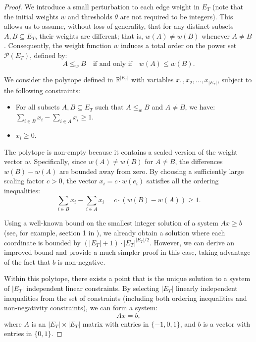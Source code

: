 \documentclass[11pt, letter]{article}
\theoremstyle{remark}
\begin{document}
\begin{proof}
We introduce a small perturbation to each edge weight in $ E_T $ (note that the initial weights $w$ and thresholds $\theta$ are not required to be integers). This allows us to assume, without loss of generality, that for any distinct subsets $ A, B \subseteq E_T $, their weights are different; that is, $ w(A) \neq w(B) $ whenever $ A \neq B $. Consequently, the weight function $ w $ induces a total order on the power set $ \mathcal{P}(E_T) $, defined by:
$$
A \leq_w B \quad \text{if and only if} \quad w(A) \leq w(B).
$$

We consider the polytope defined in $ \mathbb{R}^{|E_T|} $ with variables $ x_1, x_2, \dots, x_{|E_T|} $, subject to the following constraints:

\begin{itemize}
    \item For all subsets $ A, B \subseteq E_T $ such that $ A \leq_w B $ and $A \neq B$, we have:
   $
   \sum_{i \in B} x_i - \sum_{i \in A} x_i \geq 1.
   $
    \item$
   x_i \geq 0.
   $
\end{itemize}


The polytope is non-empty because it contains a scaled version of the weight vector $ w $. Specifically, since $ w(A) \neq w(B) $ for $ A \neq B $, the differences $ w(B) - w(A) $ are bounded away from zero. By choosing a sufficiently large scaling factor $ c > 0 $, the vector $ x_i = c \cdot w(e_i) $ satisfies all the ordering inequalities:
$$
\sum_{i \in B} x_i - \sum_{i \in A} x_i = c \cdot \left( w(B) - w(A) \right) \geq 1.
$$

Using a well-known bound on the smallest integer solution of a system $ Ax \geq b $ (see, for example, section 1 in \cite{Lenstra}), we already obtain a solution where each coordinate is bounded by $ (|E_T| +1) \cdot |E_T|^{|E_T|/2} $. However, we can derive an improved bound and provide a much simpler proof in this case, taking advantage of the fact that $ b $ is non-negative.

Within this polytope, there exists a point that is the unique solution to a system of $ |E_T|$ independent linear constraints. By selecting $|E_T|$ linearly independent inequalities from the set of constraints (including both ordering inequalities and non-negativity constraints), we can form a system:
$$
A x = b,
$$
where $ A $ is an $ |E_T| \times |E_T| $ matrix with entries in $ \{-1, 0, 1\} $, and $ b $ is a vector with entries in $ \{0, 1\} $.


\end{proof}
\end{document}
